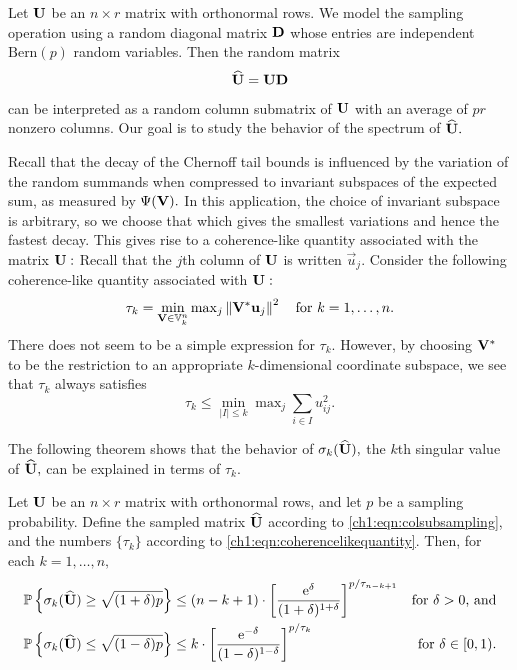 Let $\mathbf{U}$ be an $n \times r$ matrix with orthonormal rows. We model the
sampling operation using a random diagonal matrix $\mathbf{D}$ whose entries are
independent $\text{Bern}(p)$ random variables. Then the random matrix
\begin{equation}
\widehat{\mathbf{U}} = \mathbf{U}\mathbf{D}
\label{ch1:eqn:colsubsampling}
\end{equation}
can be interpreted as a random column submatrix of $\mathbf{U}$ with an average of
$p r$ nonzero columns. Our goal is to study the behavior of the spectrum of
$\widehat{\mathbf{U}}.$

Recall that the decay of the Chernoff tail bounds is influenced by the
variation of the random summands when compressed to invariant subspaces of the
expected sum, as measured by $\Psi(\mathbf{V}).$ 
In this application, the choice of invariant subspace is arbitrary, so we choose that which gives the
smallest variations and hence the fastest decay. This gives rise to a
coherence-like quantity associated with the matrix $\mathbf{U}:$ 
Recall that the $j$th column of $\mathbf{U}$ is written $\vec{u}_j.$ Consider the
following coherence-like quantity associated with $\mathbf{U}:$
\begin{equation}
 \tau_k  =  \min_{\mathbf{V} \in \mathbb{V}_{k}^{n}} \max\nolimits_j \left\|\mathbf{V}^*
\mathbf{u}_j\right\|^2 \quad \text{for } k=1,\ldots,n. 
 \label{ch1:eqn:coherencelikequantity}
\end{equation}
There does not seem to be a simple expression for $\tau_k.$ However, by choosing
$\mathbf{V}^*$ to be the restriction to an appropriate $k$-dimensional
coordinate subspace, we see that $\tau_k$ always satisfies
\[
 \tau_k \leq \min_{|I|\leq k} \max\nolimits_j \sum_{i \in I} u_{ij}^2. 
\]

The following theorem shows that the behavior of $\sigma_k(\widehat{\mathbf{U}}),$ the
$k$th singular value of $\widehat{\mathbf{U}},$ can be explained in terms of
$\tau_k.$
\begin{thm}
\label{ch1:thm:colsampling}
Let $\mathbf{U}$ be an $n \times r$ matrix with orthonormal rows, and let $p$ be a
sampling probability. Define the sampled matrix $\widehat{\mathbf{U}}$ according to
\eqref{ch1:eqn:colsubsampling}, and the numbers $\{\tau_k\}$ according to
\eqref{ch1:eqn:coherencelikequantity}.
Then, for each $k=1,\ldots,n,$
\begin{align*}
\mathbb{P}\left\{\sigma_k(\widehat{\mathbf{U}}) \geq \sqrt{(1 + \delta) p}\right\} & \leq (n-k+1) \cdot
\left[ \frac{\mathrm{e}^\delta}{(1+\delta)^{1+\delta}} \right]^{p/\tau_{n-k+1}} &
\text{for $\delta > 0$, and} \\
\mathbb{P}\left\{\sigma_k(\widehat{\mathbf{U}}) \leq \sqrt{(1- \delta)p} \right\} & \leq k \cdot \left[
\frac{\mathrm{e}^{-\delta}}{(1-\delta)^{1-\delta}} \right]^{p/\tau_k } & \text{for
$\delta \in [0,1).$} 
\end{align*}

\end{thm}

